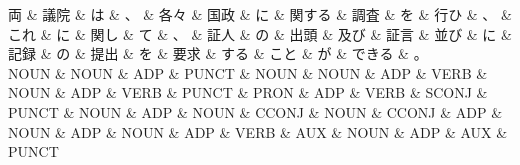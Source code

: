 \documentclass[tikz,border=5pt]{standalone}
\begin{document}
\small
\begin{dependency}[edge unit distance=12.0pt]
    \begin{deptext}[column sep=0.5em]
        両 \& 議院 \& は \& 、 \& 各々 \& 国政 \& に \& 関する \& 調査 \& を \& 行ひ \& 、 \& これ \& に \& 関し \& て \& 、 \& 証人 \& の \& 出頭 \& 及び \& 証言 \& 並び \& に \& 記録 \& の \& 提出 \& を \& 要求 \& する \& こと \& が \& できる \& 。\\
        NOUN \& NOUN \& ADP \& PUNCT \& NOUN \& NOUN \& ADP \& VERB \& NOUN \& ADP \& VERB \& PUNCT \& PRON \& ADP \& VERB \& SCONJ \& PUNCT \& NOUN \& ADP \& NOUN \& CCONJ \& NOUN \& CCONJ \& ADP \& NOUN \& ADP \& NOUN \& ADP \& VERB \& AUX \& NOUN \& ADP \& AUX \& PUNCT\\
    \end{deptext}
\end{dependency}
\end{document}
